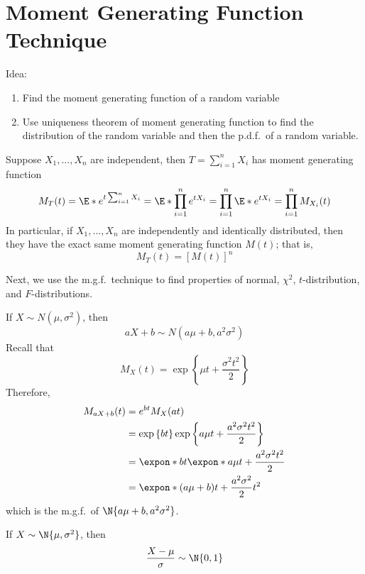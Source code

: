 \section{Moment Generating Function Technique}
Idea:
\begin{enumerate}[label=(\arabic*)]
    \item Find the moment generating function of a random variable
    \item Use uniqueness theorem of moment generating function
          to find the distribution of the random variable and then
          the p.d.f.\ of a random variable.
\end{enumerate}
\begin{Theorem}{}{}
    Suppose $ X_1,\ldots,X_n $
    are independent, then $ T=\sum_{i=1}^{n} X_i $
    has moment generating function
    \[ M_T(t)=\E*{e^{t \sum_{i=1}^{n} X_i}}=
        \E*{\prod_{i=1}^n e^{tX_i}}=\prod_{i=1}^n \E*{e^{tX_i}}=
        \prod_{i=1}^n M_{X_i}(t) \]
    In particular, if $ X_1,\ldots,X_n $ are independently
    and identically distributed, then they
    have the exact same moment generating function $ M(t) $;
    that is,
    \[ M_T(t)=\left[ M(t) \right]^n \]
\end{Theorem}
Next, we use the m.g.f.\ technique to find properties
of normal, $ \chi^2 $, $ t $-distribution,
and $ F $-distributions.

If $ X \sim N(\mu,\sigma^2) $, then
\[ aX+b \sim N(a\mu+b,a^2\sigma^2) \]
Recall that
\[ M_X(t)
    =\exp\left\{ \mu t+\frac{\sigma^2t^2}{2}\right\} \]
Therefore,
\begin{align*}
    M_{aX+b}(t)
     & =e^{b t}M_X(at)                                                              \\
     & =\exp\left\{ b t\right\}\exp\left\{ a\mu t+\frac{a^2\sigma^2t^2}{2} \right\} \\
     & =\expon*{b t}\expon*{a\mu t+\frac{a^2\sigma^2t^2}{2}}                        \\
     & =\expon*{(a\mu+b)t+\frac{a^2\sigma^2}{2} t^2}
\end{align*}
which is the m.g.f.\ of $ \N{a\mu+b,a^2\sigma^2} $.

If $ X \sim \N{\mu,\sigma^2} $, then
\[ \frac{X-\mu}{\sigma} \sim \N{0,1} \]

